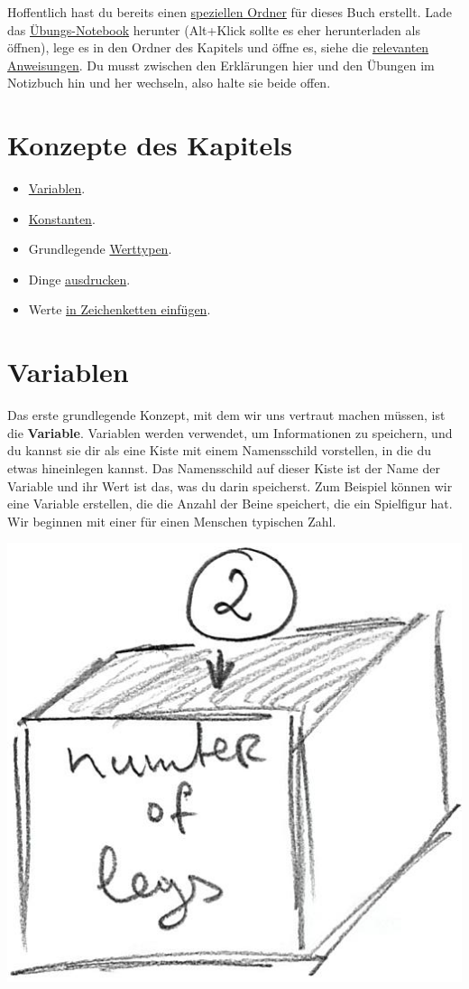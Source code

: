 \documentclass[
]{book}
\providecommand{\tightlist}{%
  \setlength{\itemsep}{0pt}\setlength{\parskip}{0pt}}
\begin{document}
Hoffentlich hast du bereits einen \protect\hyperlink{dateien-ordner}{speziellen Ordner} für dieses Buch erstellt. Lade das \href{notebooks/Basics.ipynb}{Übungs-Notebook} herunter (Alt+Klick sollte es eher herunterladen als öffnen), lege es in den Ordner des Kapitels und öffne es, siehe die \protect\hyperlink{jupyter-notebooks}{relevanten Anweisungen}. Du musst zwischen den Erklärungen hier und den Übungen im Notizbuch hin und her wechseln, also halte sie beide offen.

\hypertarget{konzepte-des-kapitels}{%
\section{Konzepte des Kapitels}\label{konzepte-des-kapitels}}

\begin{itemize}
\tightlist
\item
  \protect\hyperlink{variablen}{Variablen}.
\item
  \protect\hyperlink{konstanten}{Konstanten}.
\item
  Grundlegende \protect\hyperlink{werttypen}{Werttypen}.
\item
  Dinge \protect\hyperlink{ausdrucken}{ausdrucken}.
\item
  Werte \protect\hyperlink{formatierung-von-zeichenketten}{in Zeichenketten einfügen}.
\end{itemize}

\hypertarget{variablen}{%
\section{Variablen}\label{variablen}}

Das erste grundlegende Konzept, mit dem wir uns vertraut machen müssen, ist die \textbf{Variable}. Variablen werden verwendet, um Informationen zu speichern, und du kannst sie dir als eine Kiste mit einem Namensschild vorstellen, in die du etwas hineinlegen kannst. Das Namensschild auf dieser Kiste ist der Name der Variable und ihr Wert ist das, was du darin speicherst. Zum Beispiel können wir eine Variable erstellen, die die Anzahl der Beine speichert, die ein Spielfigur hat. Wir beginnen mit einer für einen Menschen typischen Zahl.

\begin{center}\includegraphics[width=0.5\linewidth]{images/variable-as-box} \end{center}
\end{document}

